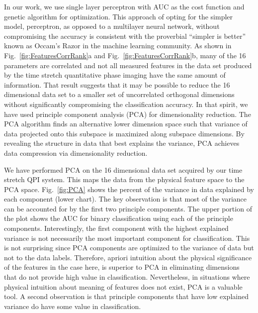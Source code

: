 \documentclass[aps,pra,reprint,longbibliography,superscriptaddress]{revtex4-1}
\begin{document}
In our work, we use single layer perceptron with AUC as the cost function and genetic algorithm for optimization. This approach of opting for the simpler model, perceptron, as opposed to a multilayer neural network, without compromising the accuracy is consistent with the proverbial ``simpler is better'' known as Occam's Razor \cite{domingos1999role} in the machine learning community. As shown in Fig.~\ref{fig:FeaturesCorrRank}a and Fig.~\ref{fig:FeaturesCorrRank}b, many of the 16 parameters are correlated and not all measured features in the data set produced by the time stretch quantitative phase imaging have the same amount of information. That result suggests that it may be possible to reduce the 16 dimensional data set to a smaller set of uncorrelated orthogonal dimensions without significantly compromising the classification accuracy. In that spirit, we have used principle component analysis (PCA) for dimensionality reduction. The PCA algorithm finds an alternative lower dimension space such that variance of data projected onto this subspace is maximized along subspace dimensions. By revealing the structure in data that best explains the variance, PCA achieves data compression via dimensionality reduction. 

We have performed PCA on the 16 dimensional data set acquired by our time stretch QPI system. This maps the data from the physical feature space to the PCA space. Fig.~\ref{fig:PCA} shows the percent of the variance in data explained by each component (lower chart). The key observation is that most of the variance can be accounted for by the first two principle components. The upper portion of the plot shows the AUC for binary classification using each of the principle components. Interestingly, the first component with the highest explained variance is not necessarily the most important component for classification. This is not surprising since PCA components are optimized to the variance of data but not to the data labels. Therefore, apriori intuition about the physical significance of the features in the case here, is superior to PCA in eliminating dimensions that do not provide high value in classification. Nevertheless, in situations where physical intuition about meaning of features does not exist, PCA is a valuable tool. A second observation is that principle components that have low explained variance do have some value in classification. 

\begin{figure*}
\caption{\label{fig:PCA} Principal component analysis (PCA); Upper bar chart shows accuracy of classification by each individual principal component, and lower bar chart shows the percentage of the total variance explained by each principal component, accounting for the variability expressed in the data. As expected, principal components with larger variability do not necessarily give high accuracy in classification.}
\end{figure*}
\end{document}
